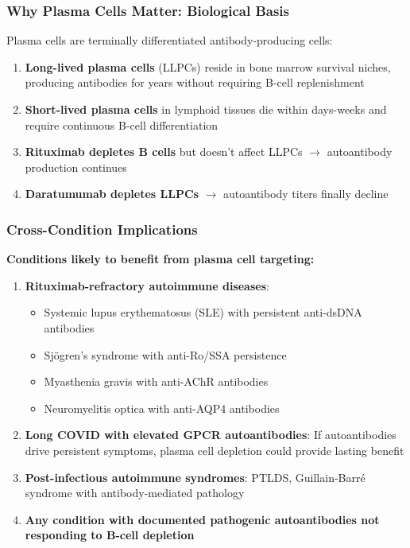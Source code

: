 \subsubsection{Why Plasma Cells Matter: Biological Basis}

Plasma cells are terminally differentiated antibody-producing cells:
\begin{enumerate}
    \item \textbf{Long-lived plasma cells} (LLPCs) reside in bone marrow survival niches, producing antibodies for years without requiring B-cell replenishment
    \item \textbf{Short-lived plasma cells} in lymphoid tissues die within days-weeks and require continuous B-cell differentiation
    \item \textbf{Rituximab depletes B cells} but doesn't affect LLPCs $\rightarrow$ autoantibody production continues
    \item \textbf{Daratumumab depletes LLPCs} $\rightarrow$ autoantibody titers finally decline
\end{enumerate}

\subsubsection{Cross-Condition Implications}

\textbf{Conditions likely to benefit from plasma cell targeting:}

\begin{enumerate}
    \item \textbf{Rituximab-refractory autoimmune diseases}:
    \begin{itemize}
        \item Systemic lupus erythematosus (SLE) with persistent anti-dsDNA antibodies
        \item Sjögren's syndrome with anti-Ro/SSA persistence
        \item Myasthenia gravis with anti-AChR antibodies
        \item Neuromyelitis optica with anti-AQP4 antibodies
    \end{itemize}

    \item \textbf{Long COVID with elevated GPCR autoantibodies}: If autoantibodies drive persistent symptoms, plasma cell depletion could provide lasting benefit

    \item \textbf{Post-infectious autoimmune syndromes}: PTLDS, Guillain-Barré syndrome with antibody-mediated pathology

    \item \textbf{Any condition with documented pathogenic autoantibodies not responding to B-cell depletion}
\end{enumerate}

